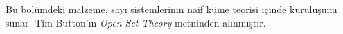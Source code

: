 
	

\begin{editorial}
Bu bölümdeki malzeme, sayı sistemlerinin naif küme teorisi içinde
kuruluşunu sunar. Tim Button'ın \emph{Open Set Theory} metninden
alınmıştır.
\end{editorial}


\OLEndChapterHook

